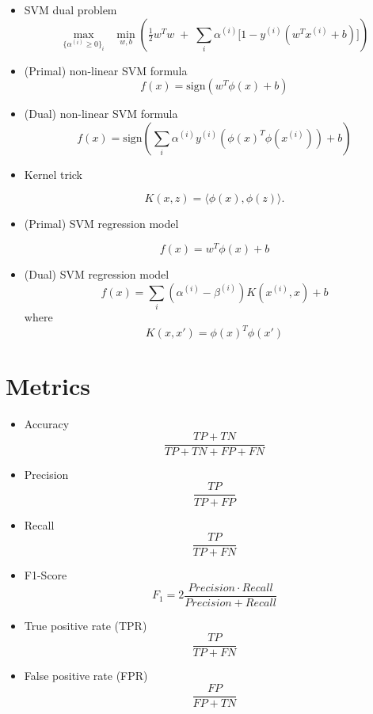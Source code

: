 \documentclass[11pt]{article}
\begin{document}
\begin{itemize}
	      \[
		      \min_{w,b} \;\; \tfrac{1}{2} w^T w
		      \quad \text{s.t.} \quad
		      y^{(i)} \big(w^T x^{(i)} + b \big) \geq 1
	      \]
	\item SVM dual problem
	      \[
		      \max_{\{\alpha^{(i)} \geq 0\}_i}
		      \;\; \min_{w,b} \left(
		      \tfrac{1}{2} w^T w \;+\;
		      \sum_i \alpha^{(i)} \Big[1 - y^{(i)} (w^T x^{(i)} + b) \Big]
		      \right)
	      \]

	\item (Primal) non-linear SVM formula
	      \[
		      f(x) = \text{sign}(w^T \phi (x) + b)
	      \]
	\item (Dual) non-linear SVM formula
	      \[
		      f(x) = \text{sign}\left( \sum_i \alpha^{(i)} y^{(i)} (\phi{(x)^T\phi{(x^{(i)})}}) + b \right)
	      \]

	\item Kernel trick

	      \[
		      K(x,z) = \langle \phi(x), \phi(z)\rangle.
	      \]

	\item (Primal) SVM regression model

	      \[
		      f(x) = w^T \phi(x) + b
	      \]
	\item (Dual) SVM regression model
	      \[
		      f(x) = \sum_i (\alpha^{(i)} - \beta^{(i)}) K(x^{(i)}, x) + b
	      \]
	      where
	      \[
		      K(x, x') = \phi(x)^T \phi(x')
	      \]

\end{itemize}

\section{Metrics}
\begin{itemize}
	\item Accuracy
	      \[
		      \frac{TP + TN}{TP + TN + FP + FN}
	      \]
	\item Precision
	      \[
		      \frac{TP}{TP+FP}
	      \]
	\item Recall
	      \[
		      \frac{TP}{TP + FN}
	      \]

	\item F1-Score
	      \[
		      F_1 = 2\frac{Precision \cdot Recall}{Precision + Recall}
	      \]
	\item True positive rate (TPR)
	      \[
		      \frac{TP}{TP+FN}
	      \]

	\item False positive rate (FPR)
	      \[
		      \frac{FP}{FP+TN}
	      \]
\end{itemize}
\end{document}
